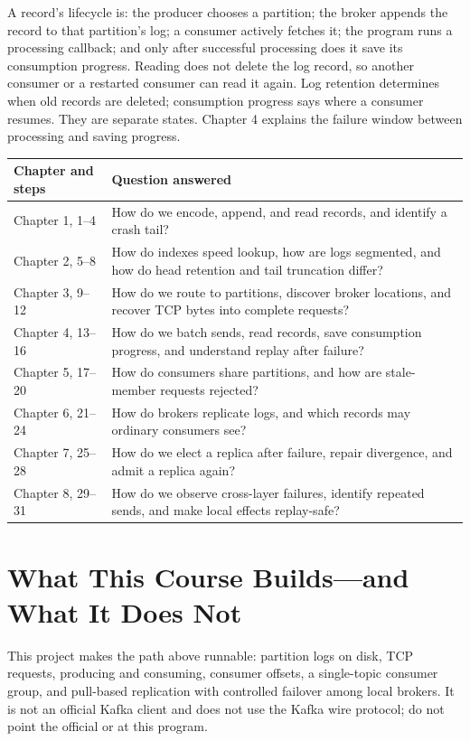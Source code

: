 A record's lifecycle is: the producer chooses a partition; the broker appends the record to that partition's log; a consumer actively fetches it; the program runs a processing callback; and only after successful processing does it save its consumption progress. Reading does not delete the log record, so another consumer or a restarted consumer can read it again. Log retention determines when old records are deleted; consumption progress says where a consumer resumes. They are separate states. Chapter 4 explains the failure window between processing and saving progress.

\begin{center}
\small
\begin{tabular}{p{}p{}}
\toprule
Chapter and steps & Question answered \\
\midrule
Chapter 1, 1--4 & How do we encode, append, and read records, and identify a crash tail?\\
Chapter 2, 5--8 & How do indexes speed lookup, how are logs segmented, and how do head retention and tail truncation differ?\\
Chapter 3, 9--12 & How do we route to partitions, discover broker locations, and recover TCP bytes into complete requests?\\
Chapter 4, 13--16 & How do we batch sends, read records, save consumption progress, and understand replay after failure?\\
Chapter 5, 17--20 & How do consumers share partitions, and how are stale-member requests rejected?\\
Chapter 6, 21--24 & How do brokers replicate logs, and which records may ordinary consumers see?\\
Chapter 7, 25--28 & How do we elect a replica after failure, repair divergence, and admit a replica again?\\
Chapter 8, 29--31 & How do we observe cross-layer failures, identify repeated sends, and make local effects replay-safe?\\
\bottomrule
\end{tabular}
\end{center}

\section{What This Course Builds—and What It Does Not}
This project makes the path above runnable: partition logs on disk, TCP requests, producing and consuming, consumer offsets, a single-topic consumer group, and pull-based replication with controlled failover among local brokers. It is not an official Kafka client and does not use the Kafka wire protocol; do not point the official  or  at this program.

